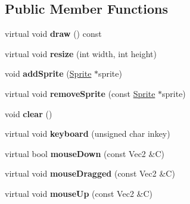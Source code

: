 \subsection*{Public Member Functions}
\begin{DoxyCompactItemize}
\item 
\hypertarget{classg2c_1_1_world_a89ea53bb9b6d3707cf2c0b7962bfa737}{
virtual void {\bfseries draw} () const }
\label{classg2c_1_1_world_a89ea53bb9b6d3707cf2c0b7962bfa737}

\item 
\hypertarget{classg2c_1_1_world_a6831ffc6d36c02ba3d7483bafed27024}{
virtual void {\bfseries resize} (int width, int height)}
\label{classg2c_1_1_world_a6831ffc6d36c02ba3d7483bafed27024}

\item 
\hypertarget{classg2c_1_1_world_af463addaa10be8b1ca3950950ca2f6ca}{
void {\bfseries addSprite} (\hyperlink{classg2c_1_1_sprite}{Sprite} $\ast$sprite)}
\label{classg2c_1_1_world_af463addaa10be8b1ca3950950ca2f6ca}

\item 
\hypertarget{classg2c_1_1_world_ad7fa162a6b1f464a8fb3762053d53353}{
virtual void {\bfseries removeSprite} (const \hyperlink{classg2c_1_1_sprite}{Sprite} $\ast$sprite)}
\label{classg2c_1_1_world_ad7fa162a6b1f464a8fb3762053d53353}

\item 
\hypertarget{classg2c_1_1_world_a885f5b4302faa8ee1330852d5b3ee35c}{
void {\bfseries clear} ()}
\label{classg2c_1_1_world_a885f5b4302faa8ee1330852d5b3ee35c}

\item 
\hypertarget{classg2c_1_1_world_a8b089f07c3bc3850fcb2f7cfd3bfda53}{
virtual void {\bfseries keyboard} (unsigned char inkey)}
\label{classg2c_1_1_world_a8b089f07c3bc3850fcb2f7cfd3bfda53}

\item 
\hypertarget{classg2c_1_1_world_a49e7c3d3d1b3a5047d1ecf3e24cf8687}{
virtual bool {\bfseries mouseDown} (const Vec2 \&C)}
\label{classg2c_1_1_world_a49e7c3d3d1b3a5047d1ecf3e24cf8687}

\item 
\hypertarget{classg2c_1_1_world_a125b1536baaf56642d664e211ce62b36}{
virtual void {\bfseries mouseDragged} (const Vec2 \&C)}
\label{classg2c_1_1_world_a125b1536baaf56642d664e211ce62b36}

\item 
\hypertarget{classg2c_1_1_world_af46d3cdc3aa030e3a7249b7068e98358}{
virtual void {\bfseries mouseUp} (const Vec2 \&C)}
\label{classg2c_1_1_world_af46d3cdc3aa030e3a7249b7068e98358}


\end{DoxyCompactItemize}
